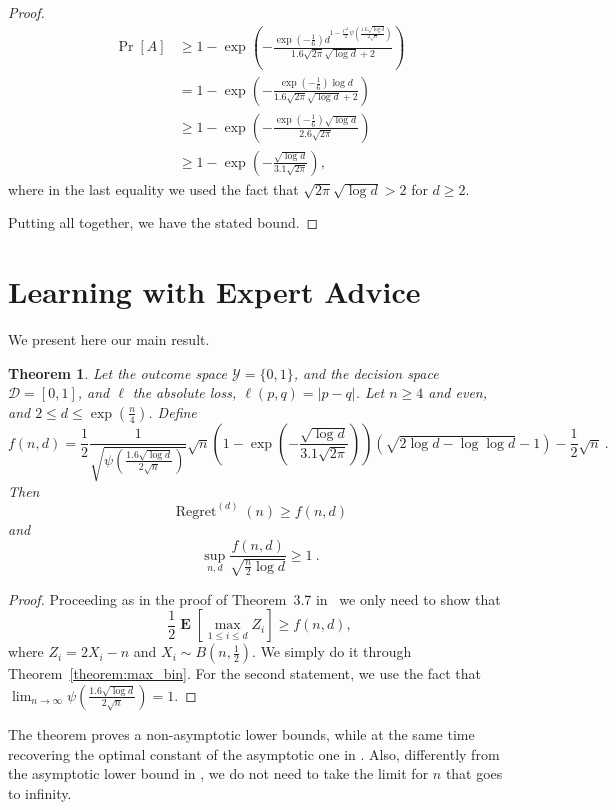 \documentclass{article}
\DeclareMathOperator*{\Exp}{\mathbf{E}}
\DeclareMathOperator{\Regret}{Regret}
\newtheorem{theorem}{Theorem}
\begin{document}
\begin{proof}
\begin{align*}
\Pr[A]
& \ge 1 - \exp\left(-\frac{\exp\left(-\frac{1}{6}\right) d^{1-\frac{C^2}{2} \psi\left(\frac{1.6 \sqrt{\log d}}{2 \sqrt{n}}\right)}}{1.6 \sqrt{2\pi} \sqrt{\log d}+2}\right) \\
& = 1 - \exp\left(-\frac{\exp\left(-\frac{1}{6}\right) \log d}{1.6 \sqrt{2\pi} \sqrt{\log d}+2}\right) \\
& \ge 1 - \exp\left(-\frac{\exp\left(-\frac{1}{6}\right) \sqrt{\log d}}{2.6 \sqrt{2\pi}}\right)\\
& \ge 1 - \exp\left(-\frac{\sqrt{\log d}}{3.1 \sqrt{2\pi}}\right),
\end{align*}
where in the last equality we used the fact that $\sqrt{2\pi} \sqrt{\log d} > 2$ for $d\ge 2$.

Putting all together, we have the stated bound.
\end{proof}

\section{Learning with Expert Advice}
\label{section:experts}

We present here our main result.

\begin{theorem}
Let the outcome space $\mathcal{Y}=\{0,1\}$, and the decision space
$\mathcal{D}=[0,1]$, and $\ell$ the absolute loss, $\ell(p,q)=|p-q|$. Let $n
\ge 4$ and even, and $2\le d \le \exp(\frac{n}{4})$.  Define
\[
f(n,d)=\frac{1}{2}\frac{1}{\sqrt{\psi\left(\frac{1.6 \sqrt{\log d}}{2 \sqrt{n}}\right)}}\sqrt{n}\left(1 - \exp\left(-\frac{\sqrt{\log d}}{3.1 \sqrt{2\pi}}\right)\right) \left(\sqrt{2 \log d -\log \log d}-1\right) -\frac{1}{2}\sqrt{n}~.
\]
Then
\[
\Regret^{(d)}(n)\ge f(n,d)
\]
and
\[
\sup_{n,d} \frac{f(n,d)}{\sqrt{\frac{n}{2} \log d}} \ge 1~.
\]
\end{theorem}
%
\begin{proof}
Proceeding as in the proof of Theorem~3.7 in~\citep{Cesa-BianchiL06} we only need to show that
\[
\frac{1}{2} \Exp \left[ \max_{1 \le i \le d} Z_i\right] \ge f(n,d),
\]
where $Z_i= 2 X_i - n$ and $X_i \sim B(n, \frac{1}{2})$. We simply do it through Theorem~\ref{theorem:max_bin}.
For the second statement, we use the fact that $\lim_{n \to \infty} \psi\left(\frac{1.6 \sqrt{\log d}}{2 \sqrt{n}}\right) = 1$.
\end{proof}

The theorem proves a non-asymptotic lower bounds, while at the same time
recovering the optimal constant of the asymptotic one in
\citet{Cesa-BianchiL06}. Also, differently from the asymptotic lower bound in
\citet{Cesa-BianchiL06}, we do not need to take the limit for $n$ that goes to
infinity.
\end{document}
